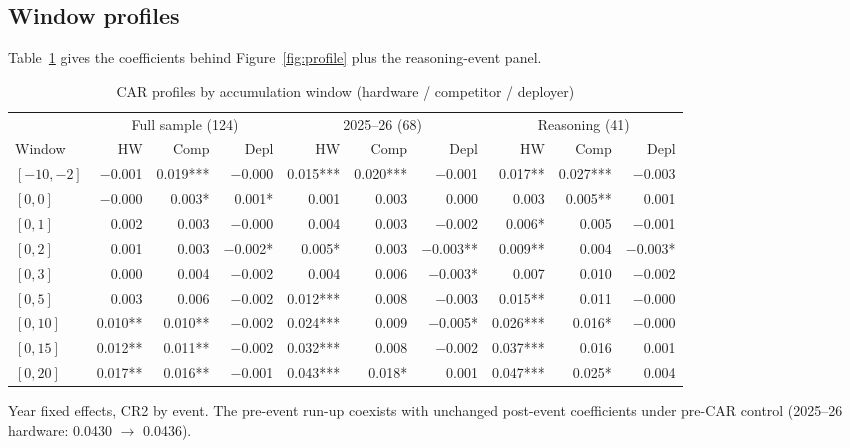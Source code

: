 \documentclass[review,12pt,authoryear]{elsarticle}
\begin{document}
\subsection{Window profiles}
Table~\ref{tab:app_profile} gives the coefficients behind
Figure~\ref{fig:profile} plus the reasoning-event panel.

\begin{table}[htbp]
\centering
\caption{CAR profiles by accumulation window (hardware / competitor / deployer)}
\label{tab:app_profile}
\footnotesize
\begin{tabular}{lrrr@{\hskip 1.5em}rrr@{\hskip 1.5em}rrr}
\toprule
& \multicolumn{3}{c}{Full sample (124)} & \multicolumn{3}{c}{2025--26 (68)}
& \multicolumn{3}{c}{Reasoning (41)} \\
Window & HW & Comp & Depl & HW & Comp & Depl & HW & Comp & Depl \\
\midrule
$[-10,-2]$ & $-$0.001 & 0.019*** & $-$0.000 & 0.015*** & 0.020*** & $-$0.001 & 0.017** & 0.027*** & $-$0.003 \\
$[0,0]$    & $-$0.000 & 0.003*   & 0.001*   & 0.001    & 0.003    & 0.000    & 0.003   & 0.005**  & 0.001 \\
$[0,1]$    & 0.002    & 0.003    & $-$0.000 & 0.004    & 0.003    & $-$0.002 & 0.006*  & 0.005    & $-$0.001 \\
$[0,2]$    & 0.001    & 0.003    & $-$0.002* & 0.005*  & 0.003    & $-$0.003** & 0.009** & 0.004  & $-$0.003* \\
$[0,3]$    & 0.000    & 0.004    & $-$0.002 & 0.004    & 0.006    & $-$0.003* & 0.007   & 0.010    & $-$0.002 \\
$[0,5]$    & 0.003    & 0.006    & $-$0.002 & 0.012*** & 0.008    & $-$0.003 & 0.015** & 0.011    & $-$0.000 \\
$[0,10]$   & 0.010**  & 0.010**  & $-$0.002 & 0.024*** & 0.009    & $-$0.005* & 0.026*** & 0.016* & $-$0.000 \\
$[0,15]$   & 0.012**  & 0.011**  & $-$0.002 & 0.032*** & 0.008    & $-$0.002 & 0.037*** & 0.016   & 0.001 \\
$[0,20]$   & 0.017**  & 0.016**  & $-$0.001 & 0.043*** & 0.018*   & 0.001    & 0.047*** & 0.025*  & 0.004 \\
\bottomrule
\end{tabular}

\footnotesize Year fixed effects, CR2 by event. The pre-event run-up
coexists with unchanged post-event coefficients under pre-CAR control
(2025--26 hardware: 0.0430 $\to$ 0.0436).
\end{table}
\end{document}
